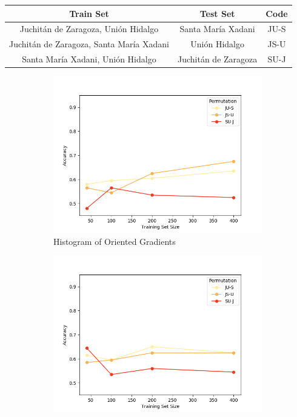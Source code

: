 \begin{center}
  \begin{tabular}{|c|c|c|}
    \hline
    Train Set                                      &Test Set               &Code \\ \hline
    Juchit\'an de Zaragoza, Uni\'on Hidalgo        &Santa Mar\'ia Xadani   &JU-S \\ \hline
    Juchit\'an de Zaragoza, Santa Mar\'ia Xadani   &Uni\'on Hidalgo        &JS-U \\ \hline
    Santa Mar\'ia Xadani, Uni\'on Hidalgo          &Juchit\'an de Zaragoza &SU-J \\ 
    \hline
  \end{tabular}
  \label{table:classic}
\end{center}

\begin{figure}[ht]
  \centering
    \begin{subfigure}{.49\textwidth}
        \includegraphics[width=\textwidth]{images/classic-hog.png}
        \caption{Histogram of Oriented Gradients}
    \end{subfigure}
    \begin{subfigure}{.49\textwidth}
        \includegraphics[width=\textwidth]{images/classic-means.png}

\end{subfigure}
\end{figure}
